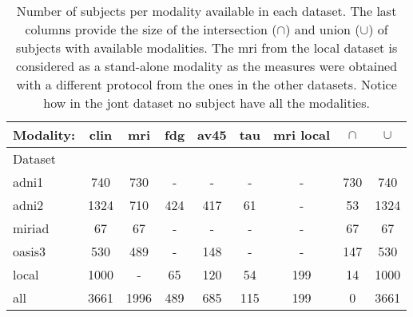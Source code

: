 \begin{table*}[!t]
\caption{
Number of subjects per modality available in each dataset.
The last columns provide the size of the intersection ($\cap$) and union ($\cup$) of subjects with available modalities.
The mri from the local dataset is considered as a stand-alone modality as the measures were obtained with a different protocol from the ones in the other datasets.
Notice how in the jont dataset no subject have all the modalities.
}
\centering
\begin{tabular}{lcccccc|cc}
\toprule
Modality: &    clin &   mri &  fdg & av45 &  tau & mri local & $\cap$ & $\cup$ \\
\midrule
Dataset \\
adni1   &   740 &   730 &    - &    - &    - &          - & 730 &  740 \\
adni2   &  1324 &   710 &  424 &  417 &   61 &          - &  53 & 1324 \\
miriad  &    67 &    67 &    - &    - &    - &          - &  67 &   67 \\
oasis3  &   530 &   489 &    - &  148 &    - &          - & 147 &  530 \\
local   &  1000 &     - &   65 &  120 &   54 &        199 &  14 & 1000 \\
\midrule
all     &  3661 &  1996 &  489 &  685 &  115 &        199 &   0 & 3661 \\
\bottomrule
\end{tabular}
\label{table:datasets}
\end{table*}
